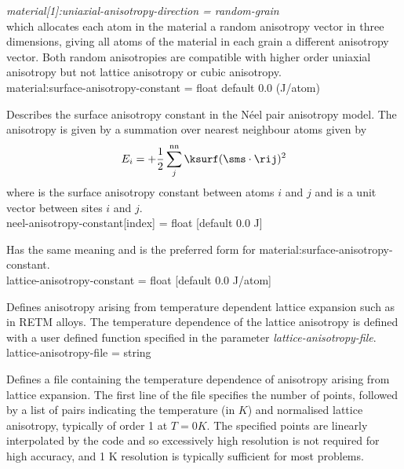 \textit{material[1]:uniaxial-anisotropy-direction = random-grain}\\

which allocates each atom in the material a random anisotropy vector in three
dimensions, giving all atoms of the material in each grain a different
anisotropy vector. Both random anisotropies are compatible with higher order
uniaxial anisotropy but not lattice anisotropy or cubic anisotropy.\\



{\zicf material:surface-anisotropy-constant = float default 0.0 (J/atom)}
Describes the surface anisotropy constant in the N\'eel pair anisotropy model.
The anisotropy is given by a summation over nearest neighbour atoms given by
\begin{equation*}
E_i = +\frac{1}{2} \sum_j^{\mathrm{nn}} \ksurf (\sms \cdot \rij )^2
\end{equation*}
where \ksurf is the surface anisotropy constant between atoms $i$ and $j$ and
\rij is a unit vector between sites $i$ and $j$.\\

{\zicf neel-anisotropy-constant[index] = float [default 0.0 J]}
Has the same meaning and is the preferred form for material:surface-anisotropy-constant.\\

{\zicf lattice-anisotropy-constant = float [default 0.0 J/atom]}
Defines anisotropy arising from temperature dependent lattice expansion
such as in RETM alloys. The temperature dependence of the lattice anisotropy is
defined with a user defined function specified in the parameter
\textit{lattice-anisotropy-file}.\\

{\zicf lattice-anisotropy-file = string}
Defines a file containing the temperature dependence of anisotropy arising from
lattice expansion. The first line of the file specifies the number of points,
followed by a list of pairs indicating the temperature (in $K$) and normalised
lattice anisotropy, typically of order 1 at $T = 0 K$. The specified points are
linearly interpolated by the code and so excessively high resolution is not
required for high accuracy, and 1 K resolution is typically sufficient for most
problems.\\

